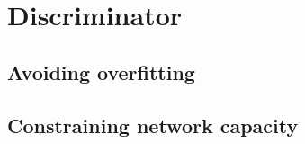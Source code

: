 \documentclass[../../main.tex]{subfiles}
\begin{document}
\chapter{Discriminator}

\section{Avoiding overfitting}

\section{Constraining network capacity}
\end{document}
